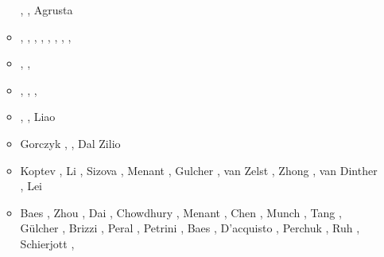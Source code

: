 \begin{itemize}
\begin{scriptsize}
\begin{itemize}
                            \cite{gery13}\cite{milp13},
                            \cite{rugb13}\cite{scdg13},
                            Agrusta \etal \cite{agat13}
\item[\twothousandfourteen] \cite{dugs14}\cite{puge14},
                            \cite{voge14b}\cite{bagb14},
                            \cite{lige14}\cite{stjm14},
                            \cite{malg14}\cite{buge14},
                            \cite{gosk14}\cite{vamd14},
                            \cite{macg14}\cite{basc14},
                            \cite{gobg14}\cite{gery14},
                            \cite{gery14b}\cite{gita14},
                            \cite{sigb14}
\item[\twothousandfifteen] \cite{uewg15}\cite{rula15},
                           \cite{gesb15}\cite{rula15},
                           \cite{kocb15}\cite{hevg15}
\item[\twothousandsixteen] \cite{kobc16}\cite{magc16},
                           \cite{fige16}\cite{mauw16},
                           \cite{duay16}\cite{mesj16},
                           \cite{huwc16}\cite{staj16}
\item[\twothousandseventeen] \cite{mauw17}\cite{kocb17},
                             \cite{vomc17}\cite{shwl17}, 
                             Liao \etal \cite{liwg17}
\item[\twothousandeighteen] Gorczyk \etal \cite{gomb18}, \cite{zhlg18}
                            \cite{masg18}\cite{gebu18}
                            \cite{hegv18}, Dal Zilio \etal \cite{davg18}
\item[\twothousandnineteen] Koptev \etal \cite{kobg19}, Li \etal \cite{ligc19},
                      Sizova \etal \cite{sihf19}, Menant \etal \cite{meag19},
                      Gulcher \etal \cite{gubg19}, van Zelst \etal \cite{vawg19},
                      Zhong \etal \cite{zhli19}, van Dinther \etal \cite{vakf19},
                      Lei \etal \cite{lell19}
\item[\twothousandtwenty] Baes \etal \cite{basg20}, Zhou \etal \cite{zhlg20}, 
                    Dai \etal \cite{dawl20}, Chowdhury \etal \cite{chcg20},
                    Menant \etal \cite{meag20}, Chen \etal \cite{chlc20}, Munch \etal \cite{mugu20}, 
                    Tang \etal \cite{tacm20}, G{\"u}lcher \etal \cite{gugm20}, Brizzi \etal \cite{brvf20}, 
                    Peral \etal \cite{perz20}, Petrini \etal \cite{pegy20}, 
                    Baes \etal \cite{basg20b}, D'acquisto \etal \cite{dadm20},
                    Perchuk \etal \cite{pegz20}, Ruh \cite{ruh20}, Schierjott \etal \cite{sctr20},

\end{itemize}
\end{scriptsize}
\end{itemize}
